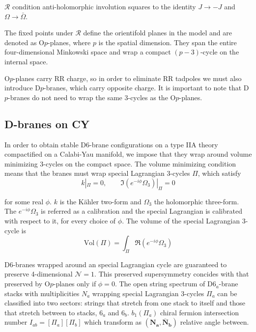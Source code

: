 $\mathcal R$ condition anti-holomorphic involution squares to the identity
$J\to -J$ and $\Omega \to \bar \Omega$.

The fixed points under $\mathcal R$ define the orientifold planes in the model and are denoted
as O$p$-planes, where $p$ is the spatial dimension.
They span the entire four-dimensional Minkowski space and wrap a compact $(p-3)$-cycle on the internal space.

O$p$-planes carry RR charge, so in order to eliminate RR tadpoles we must also introduce D$p$-branes,
which carry opposite charge.
It is important to note that D$p$-branes do not need to wrap the same 3-cycles as the O$p$-planes.


\subsection{D-branes on CY}

In order to obtain stable D6-brane configurations on a type IIA theory compactified on a Calabi-Yau manifold, 
we impose that they wrap around volume minimizing 3-cycles on the compact space.
The volume minimizing condition means that the branes must wrap special Lagrangian 3-cycles $\Pi$, which satisfy
\begin{equation}
  k|_\Pi = 0 , \qquad \Im (e^{-i\phi}\Omega_3)|_\Pi=0
\end{equation}

for some real $\phi$. $k$ is the Kähler two-form and $\Omega_3$ the holomorphic three-form.
The $e^{-i\phi}\Omega_3$ is referred as a calibration and the special Lagrangian is calibrated with respect to it, for every choice of $\phi$.
The volume of the special Lagrangian 3-cycle is
\begin{equation}
  \mathrm{Vol}(\Pi)=\int_\Pi \Re(e^{-i\phi}\Omega_3)
\end{equation}


D6-branes wrapped around an special Lagrangian cycle are guaranteed to preserve 4-dimensional $\mathcal N=1$. 
This preserved supersymmetry concides with that preserved by O$p$-planes only if $\phi=0$.
The open string spectrum of D$6_a$-brane stacks with multiplicities $N_a$ wrapping special Lagrangian 3-cycles $\Pi_a$ 
can be classified into two sectors: strings that stretch from one stack to itself and those that stretch between to stacks, $6_a$ and $6_b$.
$b_1(\Pi_a)$ 
  chiral fermion intersection number $I_{ab}=[\Pi_a][\Pi_b]$ which transform as $(\mathbf{N_a},\mathbf{\bar N_b})$ relative angle between.


